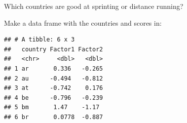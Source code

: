\documentclass[
  ignorenonframetext,
]{beamer}
\newenvironment{Shaded}{\begin{snugshade}}{\end{snugshade}}
\newcommand{\DataTypeTok}[1]{\textcolor[rgb]{0.13,0.29,0.53}{#1}}
\newcommand{\DecValTok}[1]{\textcolor[rgb]{0.00,0.00,0.81}{#1}}
\newcommand{\KeywordTok}[1]{\textcolor[rgb]{0.13,0.29,0.53}{\textbf{#1}}}
\newcommand{\NormalTok}[1]{#1}
\newcommand{\OperatorTok}[1]{\textcolor[rgb]{0.81,0.36,0.00}{\textbf{#1}}}
\newcommand{\StringTok}[1]{\textcolor[rgb]{0.31,0.60,0.02}{#1}}
\begin{document}
\begin{frame}[fragile]{Which countries are good at sprinting or distance
running?}
\protect\hypertarget{which-countries-are-good-at-sprinting-or-distance-running}{}

Make a data frame with the countries and scores in:

\begin{Shaded}
\end{Shaded}

\begin{verbatim}
## # A tibble: 6 x 3
##   country Factor1 Factor2
##   <chr>     <dbl>   <dbl>
## 1 ar       0.336   -0.265
## 2 au      -0.494   -0.812
## 3 at      -0.742    0.176
## 4 be      -0.796   -0.239
## 5 bm       1.47    -1.17 
## 6 br       0.0778  -0.887
\end{verbatim}

\end{frame}
\end{document}
